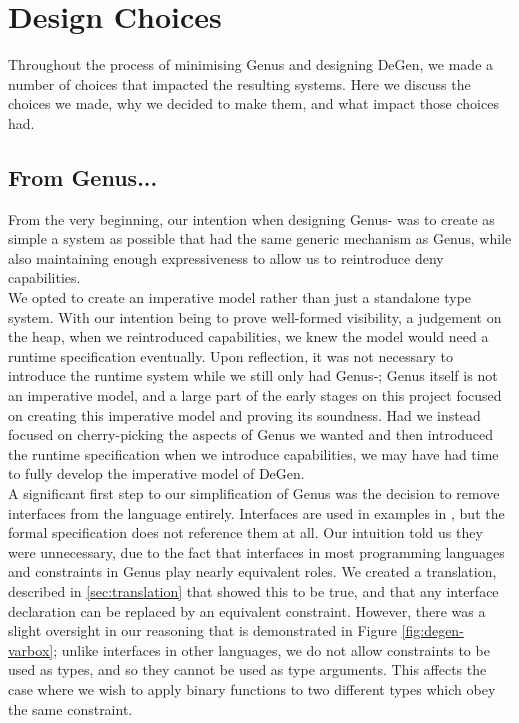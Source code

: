 \section{Design Choices}

Throughout the process of minimising Genus and designing DeGen, we made a number of choices that impacted the resulting systems. Here we discuss the choices we made, why we decided to make them, and what impact those choices had.

\subsection{From Genus...}

From the very beginning, our intention when designing Genus- was to create as simple a system as possible that had the same generic mechanism as Genus, while also maintaining enough expressiveness to allow us to reintroduce deny capabilities. \\

We opted to create an imperative model rather than just a standalone type system. With our intention being to prove well-formed visibility, a judgement on the heap, when we reintroduced capabilities, we knew the model would need a runtime specification eventually. Upon reflection, it was not necessary to introduce the runtime system while we still only had Genus-; Genus itself is not an imperative model, and a large part of the early stages on this project focused on creating this imperative model and proving its soundness. Had we instead focused on cherry-picking the aspects of Genus we wanted and then introduced the runtime specification when we introduce capabilities, we may have had time to fully develop the imperative model of DeGen. \\

A significant first step to our simplification of Genus was the decision to remove interfaces from the language entirely. Interfaces are used in examples in \cite{Zhang2015}, but the formal specification does not reference them at all. Our intuition told us they were unnecessary, due to the fact that interfaces in most programming languages and constraints in Genus play nearly equivalent roles. We created a translation, described in \ref{sec:translation} that showed this to be true, and that any interface declaration can be replaced by an equivalent constraint. However, there was a slight oversight in our reasoning that is demonstrated in Figure \ref{fig:degen-varbox}; unlike interfaces in other languages, we do not allow constraints to be used as types, and so they cannot be used as type arguments. This affects the case where we wish to apply binary functions to two different types which obey the same constraint. \\

